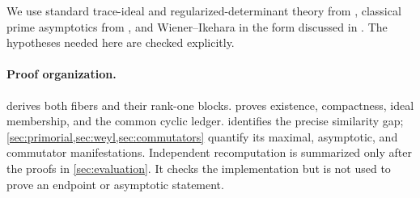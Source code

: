 We use standard trace-ideal and regularized-determinant theory from
\cite{Simon2005}, classical prime asymptotics from
\cite{MontgomeryVaughan2006}, and Wiener--Ikehara in the form discussed in
\cite{Korevaar2004}.  The hypotheses needed here are checked explicitly.

\paragraph{Proof organization.}
 derives both fibers and their rank-one blocks.
 proves existence, compactness, ideal membership, and the
common cyclic ledger.   identifies the precise
similarity gap; \cref{sec:primorial,sec:weyl,sec:commutators} quantify its
maximal, asymptotic, and commutator manifestations.  Independent
recomputation is summarized only after the proofs in
\cref{sec:evaluation}.  It checks the implementation but is not used to
prove an endpoint or asymptotic statement.
